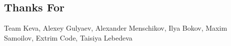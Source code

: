 \subsection{Thanks For}

Team Keva, Alexey Gulyaev, Alexander Menschikov, Ilya Bokov, Maxim Samoilov, Extrim Code, Taisiya Lebedeva


